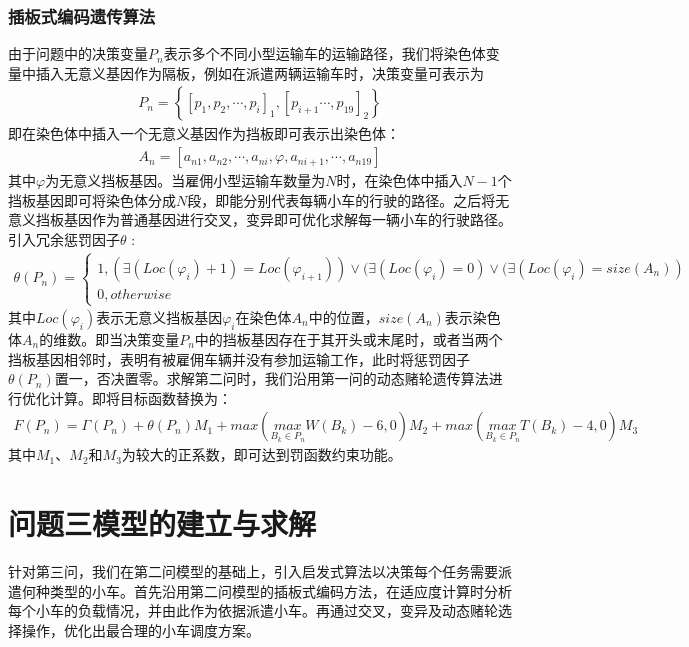 \documentclass{whutmod}
\begin{document}
      \subsubsection{插板式编码遗传算法}
      由于问题中的决策变量$P_n$表示多个不同小型运输车的运输路径，我们将染色体变量中插入无意义基因作为隔板，例如在派遣两辆运输车时，决策变量可表示为
       \begin{gather}
      P_n=\left \{[p_{1},p_{2},\cdots,p_{i}]_1,[p_{i+1}\cdots,p_{19}]_{2}\right \}
      \end{gather}
      即在染色体中插入一个无意义基因作为挡板即可表示出染色体：
       \begin{gather}
      A_n=[a_{n1},a_{n2},\cdots,a_{ni},\varphi ,a_{ni+1},\cdots,a_{n19}]
      \end{gather}
      其中$\varphi$为无意义挡板基因。当雇佣小型运输车数量为$N$时，在染色体中插入$N-1$个挡板基因即可将染色体分成$N$段，即能分别代表每辆小车的行驶的路径。之后将无意义挡板基因作为普通基因进行交叉，变异即可优化求解每一辆小车的行驶路径。引入冗余惩罚因子$\theta$ :
      \begin{gather}
      \theta(P_n)=\left\{\begin{matrix}1,(\exists (Loc(\varphi_i )+1)=Loc(\varphi_{i+1} ))\vee  (\exists (Loc(\varphi_i )=0)\vee (\exists (Loc(\varphi_i )=size(A_n))
      \\ 0,otherwise
      \end{matrix}\right.
      \end{gather}
       其中$Loc(\varphi_i )$表示无意义挡板基因$\varphi_i$在染色体$A_n$中的位置，$size(A_n)$表示染色体$A_n$的维数。即当决策变量$P_n$中的挡板基因存在于其开头或末尾时，或者当两个挡板基因相邻时，表明有被雇佣车辆并没有参加运输工作，此时将惩罚因子$\theta(P_n)$置一，否决置零。求解第二问时，我们沿用第一问的动态赌轮遗传算法进行优化计算。即将目标函数替换为：
       \begin{gather}
      F(P_n)= \Gamma (P_n)+\theta(P_n)M_1+max(\underset{B_k\in P_n}{max} W (B_k)-6 ,0) M_2+max(\underset{B_k\in P_n}{max}T (B_k)-4,0)M_3
      \end{gather}
      其中$M_1$、$M_2$和$M_3$为较大的正系数，即可达到罚函数约束功能。
  \section{问题三模型的建立与求解}
  针对第三问，我们在第二问模型的基础上，引入启发式算法以决策每个任务需要派遣何种类型的小车。首先沿用第二问模型的插板式编码方法，在适应度计算时分析每个小车的负载情况，并由此作为依据派遣小车。再通过交叉，变异及动态赌轮选择操作，优化出最合理的小车调度方案。  
\end{document}
